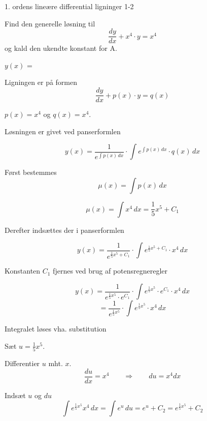 \documentclass{article}
\begin{document}
\newpage

\begin{exercise}{1. ordens lineære differential ligninger 1-2}
	
	
	Find den generelle løsning til
	\[
	\frac{dy}{dx} + x^4 \cdot y = x^4
	\]
	og kald den ukendte konstant for A.
	
	$y(x)$ =  
	
	
	
	\hint
	
	Ligningen er på formen
	\[
	\frac{dy}{dx} + p(x) \cdot y = q(x)
	\]
	
	\hint
	
	$p(x)=x^4$ og $q(x)=x^4$.
	
	\hint
	
	Løsningen er givet ved panserformlen
	
	
	\hint
	
	\[
	y(x) = \frac{1}{e^{\int p(x) \, dx}} \cdot \int e^{\int p(x) \, dx}  \cdot q(x) \, dx
	\]
	
	\hint
	
	Først bestemmes 
	\[
	\mu(x) = \int p(x) \, dx
	\]
	
	\hint
	\[
	\mu(x) = \int x^4 \, dx = \frac{1}{5} x^5 + C_1
	\]
	
	\hint
	Derefter indsættes der i  panserformlen
	
	\hint
	
	\[
	y(x) = \frac{1}{e^{\frac{1}{5}x^5 + C_1}} \cdot \int e^{\frac{1}{5}x^5 + C_1}  \cdot x^4 \, dx
	\]
	
	
	\hint
	
	Konstanten $C_1$ fjernes ved brug af potensregneregler
	
	\hint
	\[
	y(x) = \frac{1}{e^{\frac{1}{5}x^5} \cdot e^{C_1}} \cdot \int e^{\frac{1}{5}x^5} \cdot e^{C_1}  \cdot x^4 \, dx 
	\]
	\[
	= \frac{1}{e^{\frac{1}{5}x^5}} \cdot \int e^{\frac{1}{5}x^5}  \cdot x^4 \, dx
	\]
	
	\hint
	
	Integralet løses vha. substitution
	
	
	\hint
	Sæt $u = \frac{1}{5}x^5$.
	
	\hint
	
	Differentier $u$ mht. $x$.
	\[
	\frac{du}{dx} = x^4 \qquad	\Rightarrow \qquad du = x^4 dx
	\]
	
	\hint 
	Indsæt $u$ og $du$
	\[
	\int e^{\frac{1}{5}x^5}x^4 \, dx = \int e^{u} \, du = e^{u} + C_2 = e^{\frac{1}{5}x^5} + C_2
	\]
	
	\hint
	

\end{exercise}
\end{document}

